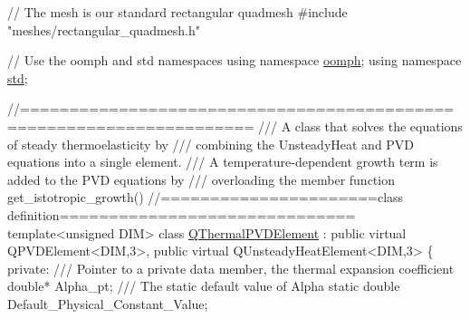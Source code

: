 \begin{DoxyCodeInclude}
\textcolor{comment}{// The mesh is our standard rectangular quadmesh}
\textcolor{preprocessor}{#include "meshes/rectangular\_quadmesh.h"}

\textcolor{comment}{// Use the oomph and std namespaces }
\textcolor{keyword}{using namespace }\hyperlink{namespaceoomph}{oomph};
\textcolor{keyword}{using namespace }\hyperlink{namespacestd}{std};



\textcolor{comment}{//=====================================================================}\textcolor{comment}{}
\textcolor{comment}{/// A class that solves the equations of steady thermoelasticity by }
\textcolor{comment}{/// combining the UnsteadyHeat and PVD equations into a single element.}
\textcolor{comment}{/// A temperature-dependent growth term is added to the PVD equations by}
\textcolor{comment}{/// overloading the member function get\_istotropic\_growth()}
\textcolor{comment}{}\textcolor{comment}{//======================class definition==============================}
\textcolor{keyword}{template}<\textcolor{keywordtype}{unsigned} DIM>
\textcolor{keyword}{class }\hyperlink{classQThermalPVDElement}{QThermalPVDElement} : \textcolor{keyword}{public} \textcolor{keyword}{virtual} QPVDElement<DIM,3>,
                           \textcolor{keyword}{public} \textcolor{keyword}{virtual} QUnsteadyHeatElement<DIM,3>
\{
\textcolor{keyword}{private}:
\textcolor{comment}{}
\textcolor{comment}{ /// Pointer to a private data member, the thermal expansion coefficient}
\textcolor{comment}{} \textcolor{keywordtype}{double}* Alpha\_pt;
 \textcolor{comment}{}
\textcolor{comment}{ /// The static default value of Alpha}
\textcolor{comment}{} \textcolor{keyword}{static} \textcolor{keywordtype}{double} Default\_Physical\_Constant\_Value;


\end{DoxyCodeInclude}
